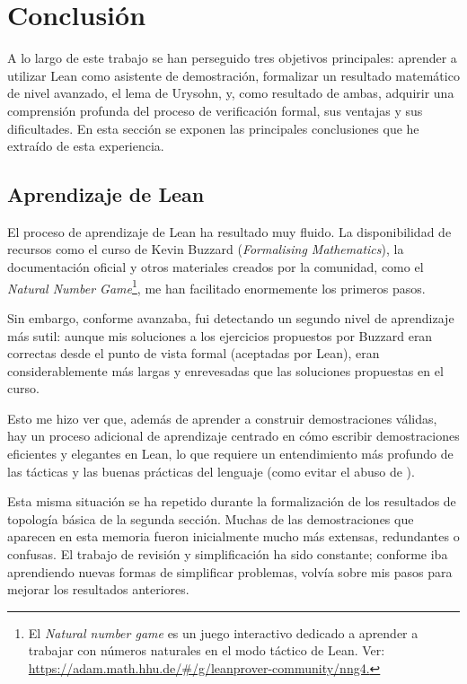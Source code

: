 \section{Conclusión}

A lo largo de este trabajo se han perseguido tres objetivos principales: aprender a utilizar Lean como asistente de demostración, formalizar un resultado matemático de nivel avanzado, el lema de Urysohn, y, como resultado de ambas, adquirir una comprensión profunda del proceso de verificación formal, sus ventajas y sus dificultades. En esta sección se exponen las principales conclusiones que he extraído de esta experiencia.

\subsection{Aprendizaje de Lean}

El proceso de aprendizaje de Lean ha resultado muy fluido. La disponibilidad de recursos como el curso de Kevin Buzzard (\textit{Formalising Mathematics}), la documentación oficial y otros materiales creados por la comunidad, como el \textit{Natural Number Game}\footnote{El \textit{Natural number game} es un juego interactivo dedicado a aprender a trabajar con números naturales en el modo táctico de Lean. Ver: \url{https://adam.math.hhu.de/#/g/leanprover-community/nng4.}}, me han facilitado enormemente los primeros pasos.

Sin embargo, conforme avanzaba, fui detectando un segundo nivel de aprendizaje más sutil: aunque mis soluciones a los ejercicios propuestos por Buzzard eran correctas desde el punto de vista formal (aceptadas por Lean), eran considerablemente más largas y enrevesadas que las soluciones propuestas en el curso.

Esto me hizo ver que, además de aprender a construir demostraciones válidas, hay un proceso adicional de aprendizaje centrado en cómo escribir demostraciones eficientes y elegantes en Lean, lo que requiere un entendimiento más profundo de las tácticas y las buenas prácticas del lenguaje (como evitar el abuso de ).

Esta misma situación se ha repetido durante la formalización de los resultados de topología básica de la segunda sección. Muchas de las demostraciones que aparecen en esta memoria fueron inicialmente mucho más extensas, redundantes o confusas. El trabajo de revisión y simplificación ha sido constante; conforme iba aprendiendo nuevas formas de simplificar problemas, volvía sobre mis pasos para mejorar los resultados anteriores.


